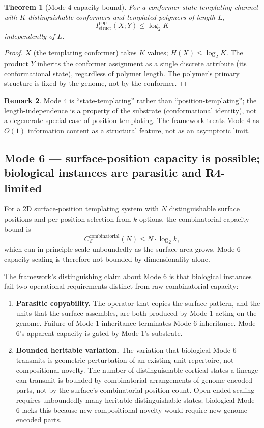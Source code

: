 \documentclass[11pt]{article}
\theoremstyle{plain}
\newtheorem{theorem}{Theorem}
\theoremstyle{definition}
\newtheorem{remark}[theorem]{Remark}
\newcommand{\Istructpop}{I_{\mathrm{struct}}^{\mathrm{pop}}}
\newcommand{\Csub}{C_{\mathcal{S}}}
\begin{document}
\begin{theorem}[Mode 4 capacity bound]
\label{thm:mode4}
For a conformer-state templating channel with $K$ distinguishable conformers and templated polymers of length $L$,
\[
\Istructpop(X; Y) \le \log_2 K
\]
independently of $L$.
\end{theorem}

\begin{proof}
$X$ (the templating conformer) takes $K$ values; $H(X) \le \log_2 K$. The product $Y$ inherits the conformer assignment as a single discrete attribute (its conformational state), regardless of polymer length. The polymer's primary structure is fixed by the genome, not by the conformer.
\end{proof}

\begin{remark}
Mode 4 is ``state-templating'' rather than ``position-templating''; the length-independence is a property of the substrate (conformational identity), not a degenerate special case of position templating. The framework treats Mode 4 as $O(1)$ information content as a structural feature, not as an asymptotic limit.
\end{remark}

\subsection{Mode 6 --- surface-position capacity is possible; biological instances are parasitic and R4-limited}
\label{sec:mode6}

For a 2D surface-position templating system with $N$ distinguishable surface positions and per-position selection from $k$ options, the combinatorial capacity bound is
\[
\Csub^{\mathrm{combinatorial}}(N) \le N \cdot \log_2 k,
\]
which can in principle scale unboundedly as the surface area grows. Mode 6 capacity scaling is therefore not bounded by dimensionality alone.

The framework's distinguishing claim about Mode 6 is that biological instances fail two operational requirements distinct from raw combinatorial capacity:

\begin{enumerate}
  \item \textbf{Parasitic copyability.} The operator that copies the surface pattern, and the units that the surface assembles, are both produced by Mode 1 acting on the genome. Failure of Mode 1 inheritance terminates Mode 6 inheritance. Mode 6's apparent capacity is gated by Mode 1's substrate.
  \item \textbf{Bounded heritable variation.} The variation that biological Mode 6 transmits is geometric perturbation of an existing unit repertoire, not compositional novelty. The number of distinguishable cortical states a lineage can transmit is bounded by combinatorial arrangements of genome-encoded parts, not by the surface's combinatorial position count. Open-ended scaling requires unboundedly many heritable distinguishable states; biological Mode 6 lacks this because new compositional novelty would require new genome-encoded parts.
\end{enumerate}
\end{document}
